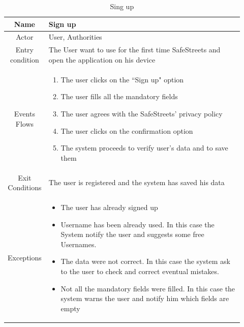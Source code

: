 \documentclass[12pt,a4paper]{report}
\begin{document}
				\begin{table}[H]
					\centering
					\begin{tabular}{|c|p{0.92\linewidth}|}
						\hline
						Name & {Sign up} \\
						\hline
						Actor & {User, Authorities} \\
						\hline
						Entry condition & {The User want to use for the first time SafeStreets and open the application on
									his device} \\
						\hline
						Events Flows &{ 
								\vskip 4pt
								\begin{enumerate}
									\item The user clicks on the ``Sign up" option
									\item The user fills all the mandatory fields
									\item The user agrees with the SafeStreets' privacy policy
									\item The user clicks on the confirmation option
									\item The system proceeds to verify user's data and to save them
								\end{enumerate}
								\vskip 4pt}\\
						\hline
						Exit Conditions & {The user is registered and the system has saved his data} \\
						\hline
						Exceptions & {
								\vskip 4pt
								\begin{itemize}
									\item The user has already signed up
									\item Username has been already used. In this case the System notify the user and
										suggests some free Usernames.
									\item The data were not correct. In this case the system ask to the user to check and
										correct eventual mistakes.
									\item Not all the mandatory fields were filled. In this case the system warns the user
										and notify him which fields are empty
								\end{itemize}
								\vskip 4pt
						} \\
						\hline
					\end{tabular}
					\caption{Sing up}
					\label{tab: }
				\end{table}
\end{document}

